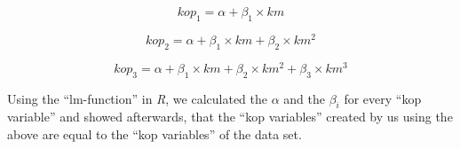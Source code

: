\begin{equation}\label{eq:price_km_poly}
	kop_1 = \alpha + \beta_1 \times km
\end{equation}

\begin{equation}\label{eq:price_km_poly}
	kop_2 = \alpha + \beta_1 \times km + \beta_2 \times km^2
\end{equation}

\begin{equation}\label{eq:price_km_poly}
	kop_3 = \alpha + \beta_1 \times km + \beta_2 \times km^2 + \beta_3 \times km^3
\end{equation}

Using the ``lm-function'' in \emph{R}, we calculated the $\alpha$ and the 
$\beta_i$ for every ``kop variable'' and showed afterwards, that the ``kop variables'' created by us using the above are equal to the ``kop variables'' of the data set.



